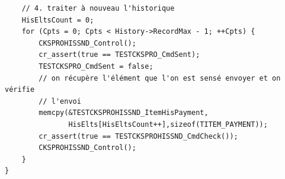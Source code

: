 \documentclass[a4paper]{article}
\begin{document}
\begin{verbatim}
    // 4. traiter à nouveau l'historique
    HisEltsCount = 0;
    for (Cpts = 0; Cpts < History->RecordMax - 1; ++Cpts) {
        CKSPROHISSND_Control();
        cr_assert(true == TESTCKSPRO_CmdSent);
        TESTCKSPRO_CmdSent = false;
        // on récupère l'élément que l'on est sensé envoyer et on vérifie
        // l'envoi
        memcpy(&TESTCKSPROHISSND_ItemHisPayment,
               HisElts[HisEltsCount++],sizeof(TITEM_PAYMENT));
        cr_assert(true == TESTCKSPROHISSND_CmdCheck());
        CKSPROHISSND_Control();
    }
}
\end{verbatim}
\label{testsaveckwash}
\end{document}
